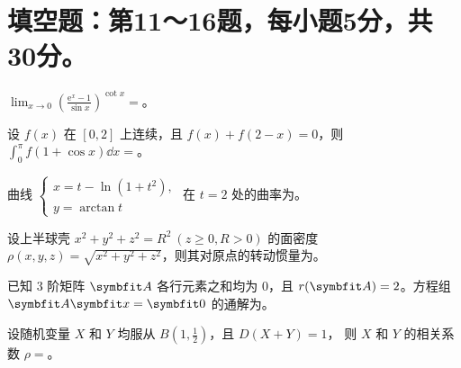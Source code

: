 \documentclass[zihao=5,fontset=windows,oneside]{exam-zh}
\begin{document}
\ifdefined\QuestionCrops\else
  \section{填空题：第11～16题，每小题5分，共30分。}
\fi

\begin{question}[index=11]
$\displaystyle\lim_{x\to 0}\left(\frac{\mathrm e^x-1}{\sin x}\right)^{\cot x}=$\fillin。
\end{question}
\QuestionBreak

\begin{question}[index=12]
设 $f(x)$ 在 $[0,2]$ 上连续，且 $f(x)+f(2-x)=0$，则 $\displaystyle\int_0^\pi f(1+\cos x)\dd x=$\fillin。
\end{question}
\QuestionBreak

\begin{question}[index=13]
曲线 $\begin{cases}x=t-\ln(1+t^2),\\ y=\arctan t\end{cases}$ 在 $t=2$ 处的曲率为\fillin。
\end{question}
\QuestionBreak

\begin{question}[index=14]
设上半球壳 $x^2+y^2+z^2=R^2\ (z\geq 0,R>0)$ 的面密度
$\rho(x,y,z)=\sqrt{x^2+y^2+z^2}$，则其对\mbox{原点}的转动惯量为\fillin。
\end{question}
\QuestionBreak

\begin{question}[index=15]
已知 $3$ 阶矩阵 $\symbfit A$ 各行元素之和均为 $0$，且 $r(\symbfit A)=2$。方程组 $\symbfit A\symbfit x=\symbfit 0$ 的通解为\fillin。
\end{question}
\QuestionBreak

\begin{question}[index=16]
设随机变量 $X$ 和 $Y$ 均服从 $B\!\left(1,\frac12\right)$，且 $D(X+Y)=1$，\allowbreak
则 $X$ 和 $Y$ 的相关系数 $\rho=$\fillin。
\end{question}
\end{document}
